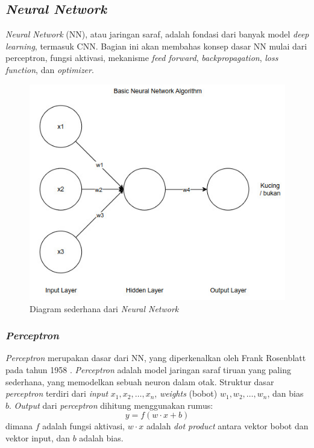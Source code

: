 \subsection{\emph{Neural Network}}
\emph{Neural Network} (NN), atau jaringan saraf, adalah fondasi dari banyak model \emph{deep learning}, termasuk CNN. Bagian ini akan membahas konsep dasar NN mulai dari perceptron, fungsi aktivasi, mekanisme \emph{feed forward}, \emph{backpropagation}, \emph{loss function}, dan \emph{optimizer}.

\begin{figure}[H]
  \centering
  \includegraphics[scale=0.6]{gambar/bab2-basic-nn.jpeg}
  \caption{Diagram sederhana dari \emph{Neural Network}}
  \label{fig:basic_nn}
\end{figure}

\subsubsection{\emph{Perceptron}}
\emph{Perceptron} merupakan dasar dari NN, yang diperkenalkan oleh Frank Rosenblatt pada tahun 1958 \parencite*{rosenblatt1958perceptron}. \emph{Perceptron} adalah model jaringan saraf tiruan yang paling sederhana, yang memodelkan sebuah neuron dalam otak. Struktur dasar \emph{perceptron} terdiri dari \emph{input} \( x_1, x_2, \dots, x_n \), \emph{weights} (bobot) \( w_1, w_2, \dots, w_n \), dan bias \( b \). \emph{Output} dari \emph{perceptron} dihitung menggunakan rumus:
\[ y = f(w \cdot x + b) \]
dimana \( f \) adalah fungsi aktivasi, \( w \cdot x \) adalah \emph{dot product} antara vektor bobot dan vektor input, dan \( b \) adalah bias.
 
